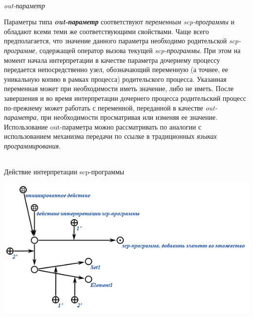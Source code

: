 \begin{frame}{\\\textit{out-параметр\scnrolesign}}
	\topline
	\justifying
	
	\vspace{10mm}
	
	Параметры типа \textbf{\textit{out-параметр\scnrolesign}} соответствуют \textit{переменным scp-программы\scnrolesign} и обладают всеми теми же соответствующими свойствами. Чаще всего предполагается, что значение данного параметра необходимо родительской \textit{scp-программе}, содержащей оператор вызова текущей \textit{scp-программы}. При этом на момент начала интерпретации в качестве параметра дочернему процессу передается непосредственно узел, обозначающий переменную (а точнее, ее уникальную копию в рамках процесса) родительского процесса. Указанная переменная может при необходимости иметь значение, либо не иметь. После завершения и во время интерпретации дочернего процесса родительский процесс по-прежнему может работать с переменной, переданной в качестве \textit{out-параметра\scnrolesign}, при необходимости просматривая или изменяя ее значение. Использование out-параметра можно рассматривать по аналогии с использованием механизма передачи по ссылке в традиционных \textit{языках программирования}.
	
\end{frame}

\begin{frame}{\\Действие интерпретации scp-программы}
	\topline
	\justifying
	
	\begin{center}
		\includegraphics[scale=0.7]{figures/sd_scp/interpreting_action.png}
	\end{center}
	
\end{frame}

